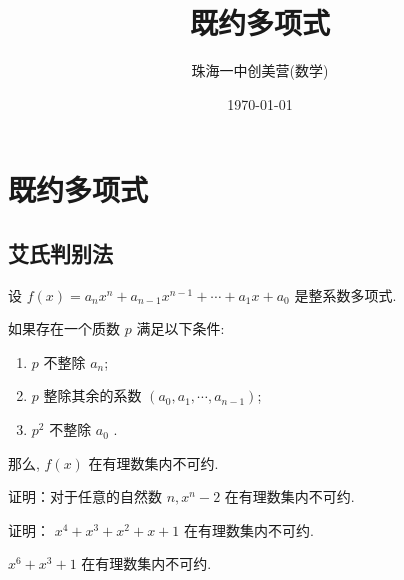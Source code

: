 \documentclass[aspectratio=169]{ctexbeamer}
\title[既约多项式]{既约多项式}
\subtitle{}
\author[珠海一中创美营]{珠海一中创美营(数学)}
\date[\today]{\today}
\theoremstyle{definition}
\begin{document}
\frame{\titlepage}

\section{既约多项式}

\subsection{艾氏判别法}
\begin{frame}
	\begin{theorem}[艾森斯坦判别法]
		设 $f(x)=a_{n} x^{n}+a_{n-1} x^{n-1}+\cdots+a_{1} x+a_{0}$ 是整系数多项式.

		如果存在一个质数 $p$ 满足以下条件:
		\begin{enumerate}
			\item $p$ 不整除 $a_{n}$;
			\item $p$ 整除其余的系数 $\left(a_{0}, a_{1}, \cdots, a_{n-1}\right)$;
			\item $p^{2}$ 不整除 $a_{0}$ .
		\end{enumerate}
		那么, $f(x)$ 在有理数集内不可约.
	\end{theorem}
\end{frame}

\setcounter{theorem}{0}
\begin{frame}[t]
	\begin{example}
		证明：对于任意的自然数 $n, x^{n}-2$ 在有理数集内不可约.
	\end{example}
\end{frame}


\begin{frame}[t]
	\begin{example}
		证明： $x^{4}+x^{3}+x^{2}+x+1$ 在有理数集内不可约.
	\end{example}
\end{frame}


\begin{frame}[t]
	\begin{example}
		$x^{6}+x^{3}+1$ 在有理数集内不可约.
	\end{example}
\end{frame}
\end{document}
